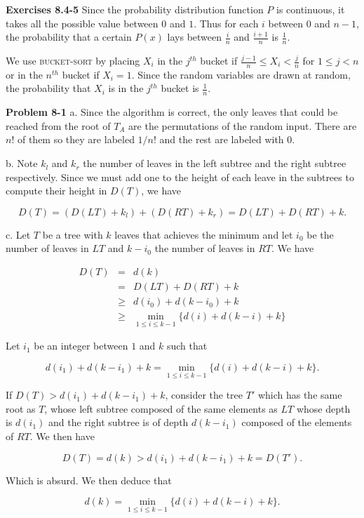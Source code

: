 \documentclass[a4paper,12pt]{article}
\newcommand{\newpar}[1]
{\bigskip \noindent \textbf{Exercises #1} \newline}
\newcommand{\newprob}[1]
{\bigskip \noindent \textbf{Problem #1} \newline}
\newcommand{\subpar}[1]{\medskip \noindent #1.}
\begin{document}
\newpar{8.4-5} Since the probability distribution function $P$ is
continuous, it takes all the possible value between $0$ and $1$.  Thus
for each $i$ between $0$ and $n-1$, the probability that a certain
$P(x)$ lays between $\frac{i}{n}$ and $\frac{i+1}{n}$ is
$\frac{1}{n}$.

We use \textsc{bucket-sort} by placing $X_i$ in the $j^{th}$ bucket if
$\frac{j-1}{n}\le X_i<\frac{j}{n}$ for $1\le j < n$ or in the $n^{th}$
bucket if $X_i = 1$.  Since the random variables are drawn at random,
the probability that $X_i$ is in the $j^{th}$ bucket is $\frac{1}{n}$.

\newprob{8-1} \subpar{a} Since the algorithm is correct, the only
leaves that could be reached from the root of $T_A$ are the
permutations of the random input.  There are $n!$ of them so they are
labeled $1/n!$ and the rest are labeled with $0$.

\subpar{b} Note $k_l$ and $k_r$ the number of leaves in the left
subtree and the right subtree respectively.  Since we must add one to
the height of each leave in the subtrees to compute their height in
$D(T)$, we have

\[ D(T) = (D(LT) + k_l) + (D(RT) + k_r) = D(LT) + D(RT) + k.\]

\subpar{c} Let $T$ be a tree with $k$ leaves that achieves the minimum
and let $i_0$ be the number of leaves in $LT$ and $k-i_0$ the number
of leaves in $RT$.  We have

\begin{eqnarray*}
  D(T) &=& d(k) \\
  &=& D(LT) + D(RT) + k \\
  &\ge& d(i_0) + d(k-i_0) + k \\
  &\ge& \min_{1\le i\le k-1}\{d(i) + d(k-i) +k\}
\end{eqnarray*}

Let $i_1$ be an integer between $1$ and $k$ such that

\[ d(i_1) + d(k-i_1) + k = \min_{1\le i\le k-1}\{d(i) + d(k-i) +k\}.\]

If $D(T) > d(i_1) + d(k-i_1) + k$, consider the tree $T'$ which has
the same root as $T$, whose left subtree composed of the same elements
as $LT$ whose depth is $d(i_1)$ and the right subtree is of depth
$d(k-i_1)$ composed of the elements of $RT$.  We then have

\[ D(T) = d(k) > d(i_1) + d(k-i_1) + k = D(T').\]

Which is absurd.  We then deduce that

\[ d(k) = \min_{1\le i\le k-1}\{d(i) + d(k-i) + k\}.\]
\end{document}
